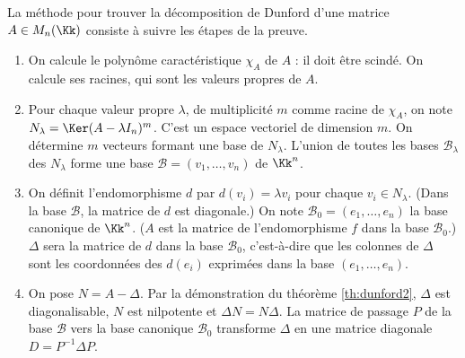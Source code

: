 \documentclass[12pt, class=report,crop=false]{standalone}
\begin{document}
La méthode pour trouver la décomposition de Dunford d'une matrice $A \in M_n(\Kk)$ consiste à suivre les étapes de la preuve.
\begin{enumerate}

  \item On calcule le polynôme caractéristique $\chi_A$ de $A$ : il doit être scindé. On calcule ses racines, qui sont les valeurs propres de $A$.
  
  \item  Pour chaque valeur propre $\lambda$, de multiplicité $m$ comme racine de $\chi_A$,
  on note $N_\lambda = \Ker (A-\lambda I_n)^m$. C'est un espace vectoriel de dimension $m$. On détermine
  $m$ vecteurs formant une base de $N_\lambda$.
L'union de toutes les bases $\mathcal{B}_\lambda$ des $N_\lambda$ forme une base $\mathcal{B}
  = (v_1,\ldots,v_n)$ de $\Kk^n$.
   
  \item On définit l'endomorphisme $d$ par $d(v_i) = \lambda v_i$ pour chaque $v_i \in N_\lambda$.  
  (Dans la base $\mathcal{B}$, la matrice de $d$ est diagonale.)
  On note $\mathcal{B}_0 = (e_1,\ldots,e_n)$ la base canonique de $\Kk^n$. ($A$
  est la matrice de l'endomorphisme $f$ dans la base $\mathcal{B}_0$.) 
  $\Delta$ sera la matrice de $d$ dans la base $\mathcal{B}_0$,
  c'est-à-dire que les colonnes de $\Delta$ sont les coordonnées des $d(e_i)$ exprimées dans la base $(e_1,\ldots,e_n)$. 
  
  \item On pose $N = A - \Delta$. Par la démonstration du théorème \ref{th:dunford2}, $\Delta$ est diagonalisable, $N$ est nilpotente et $\Delta  N = N \Delta$. La matrice de passage $P$ de la base $\mathcal{B}$ vers la base canonique $\mathcal{B}_0$ transforme $\Delta$ en une matrice diagonale $D = P^{-1}\Delta P$. 
\end{enumerate}
\end{document}
